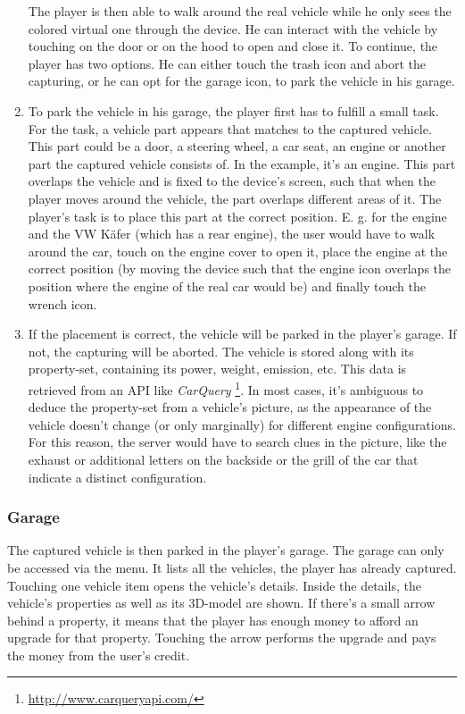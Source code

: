 \begin{enumerate}
The player is then able to walk around the real vehicle while he only sees the colored virtual one through the device. He can interact with the vehicle by touching on the door or on the hood to open and close it. To continue, the player has two options. He can either touch the trash icon and abort the capturing, or he can opt for the garage icon, to park the vehicle in his garage.
  \item To park the vehicle in his garage, the player first has to fulfill a small task. For the task, a vehicle part appears that matches to the captured vehicle. This part could be a door, a steering wheel, a car seat, an engine or another part the captured vehicle consists of. In the example, it's an engine. This part overlaps the vehicle and is fixed to the device's screen, such that when the player moves around the vehicle, the part overlaps different areas of it. The player's task is to place this part at the correct position. E. g. for the engine and the VW K\"afer (which has a rear engine), the user would have to walk around the car, touch on the engine cover to open it, place the engine at the correct position (by moving the device such that the engine icon overlaps the position where the engine of the real car would be) and finally touch the wrench icon.
  \item If the placement is correct, the vehicle will be parked in the player's garage. If not, the capturing will be aborted. The vehicle is stored along with its property-set, containing its power, weight, emission, etc. This data is retrieved from an API like \emph{CarQuery} \footnote{\url{http://www.carqueryapi.com/}}. In most cases, it's ambiguous to deduce the property-set from a vehicle's picture, as the appearance of the vehicle doesn't change (or only marginally) for different engine configurations. For this reason, the server would have to search clues in the picture, like the exhaust or additional letters on the backside or the grill of the car that indicate a distinct configuration.
\end{enumerate}

\subsubsection{Garage}
The captured vehicle is then parked in the player's garage. The garage can only be accessed via the menu. It lists all the vehicles, the player has already captured. Touching one vehicle item opens the vehicle's details. Inside the details, the vehicle's properties as well as its 3D-model are shown. If there's a small arrow behind a property, it means that the player has enough money to afford an upgrade for that property. Touching the arrow performs the upgrade and pays the money from the user's credit.

